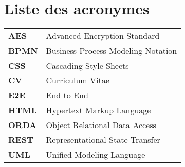 \chapter{Liste des acronymes}

\begin{spacing}{1.5}
    
\begin{tabular}{l  l}    
    \textbf{AES} &  Advanced Encryption Standard  \\
    \textbf{BPMN} & Business Process Modeling Notation \\
    \textbf{CSS} & Cascading Style Sheets \\
    \textbf{CV} & Curriculum Vitae \\
    \textbf{E2E} & End to End \\
    \textbf{HTML} & Hypertext Markup Language \\ 
    \textbf{ORDA} & Object Relational Data Access \\
    \textbf{REST} & Representational State Transfer \\
    \textbf{UML} & Unified Modeling Language \\
    
\end{tabular}
\end{spacing}
